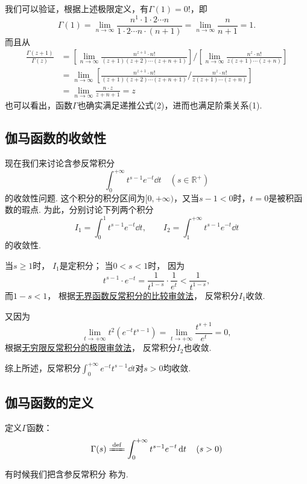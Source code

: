 我们可以验证，根据上述极限定义，有\(\Gamma(1) = 0!\)，即
\[
	\Gamma(1)
	= \lim_{n\to\infty} \frac{n^1 \cdot 1 \cdot 2 \dotsm n}{1 \cdot 2 \dotsm n \cdot (n+1)}
	= \lim_{n\to\infty} \frac{n}{n+1}
	= 1.
\]
而且从
\begin{align*}
	\frac{\Gamma(z+1)}{\Gamma(z)}
	&= \left[ \lim_{n\to\infty} \frac{n^{z+1} \cdot n!}{(z+1)(z+2)\dotsm(z+n+1)} \right] \bigg/ \left[ \lim_{n\to\infty} \frac{n^z \cdot n!}{z(z+1)\dotsm(z+n)} \right] \\
	&= \lim_{n\to\infty} \left[ \frac{n^{z+1} \cdot n!}{(z+1)(z+2)\dotsm(z+n+1)} \bigg/ \frac{n^z \cdot n!}{z(z+1)\dotsm(z+n)} \right] \\
	&= \lim_{n\to\infty} \frac{n \cdot z}{z+n+1}
	= z
\end{align*}
也可以看出，函数\(\Gamma\)也确实满足递推公式(2)，进而也满足阶乘关系(1).

\subsection{伽马函数的收敛性}
现在我们来讨论含参反常积分\[
	\int_0^{+\infty} t^{s-1} e^{-t} \dd{t} \quad(s\in\mathbb{R}^+)
\]的收敛性问题.
这个积分的积分区间为\([0,+\infty)\)，又当\(s-1<0\)时，\(t=0\)是被积函数的瑕点.
为此，分别讨论下列两个积分\[
	I_1 = \int_0^1 t^{s-1} e^{-t} \dd{t},
	\qquad
	I_2 = \int_1^{+\infty} t^{s-1} e^{-t} \dd{t}
\]的收敛性.

当\(s \geq 1\)时，
\(I_1\)是定积分；
当\(0 < s < 1\)时，
因为\[
	t^{s-1} \cdot e^{-t}
	= \frac{1}{t^{1-s}} \cdot \frac{1}{e^t} < \frac{1}{t^{1-s}},
\]
而\(1-s < 1\)，
根据\hyperref[theorem:定积分.无界函数的反常积分的比较审敛法]{无界函数反常积分的比较审敛法}，
反常积分\(I_1\)收敛.

又因为\[
	\lim_{t\to+\infty} t^2 (e^{-t} t^{s-1})
	= \lim_{t\to+\infty} \frac{t^{s+1}}{e^t} = 0,
\]
根据\hyperref[theorem:定积分.无穷限反常积分的极限审敛法]{无穷限反常积分的极限审敛法}，
反常积分\(I_2\)也收敛.

综上所述，反常积分\(\int_0^{+\infty} e^{-t} t^{s-1} \dd{t}\)对\(s > 0\)均收敛.

\subsection{伽马函数的定义}
\begin{definition}
定义\(\Gamma\)函数：
\begin{equation}\label{equation:特殊函数.伽马函数的积分定义}
	\Gamma(s)
	\defeq
	\int_0^{+\infty} t^{s-1} e^{-t} \dd{t}
	\quad(s>0)
\end{equation}
\end{definition}
有时候我们把含参反常积分 
称为.

